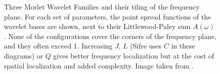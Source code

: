   \begin{figure}
    \centering
      \caption[Three Morlet Wavelet Families and their tiling of the frequency
              plane]
              {Three Morlet Wavelet Families and their tiling of the frequency
              plane. For each set of parameters, the point spread functions of
              the wavelet bases are shown, next to their Littlewood-Paley sum
              $A(\omega)$. None of the configurations cover the corners of the
              frequency plane, and they often exceed 1. 
              Increasing $J$, $L$ (Sifre uses $C$ in these
              diagrams) or $Q$ gives better frequency localization but at the
              cost of spatial localization and added complexity. Image taken
              from \cite{sifre_rigid-motion_2014-1}.}
      \label{fig:ch2:morlet_littlewood_paley}
  \end{figure}



% 
